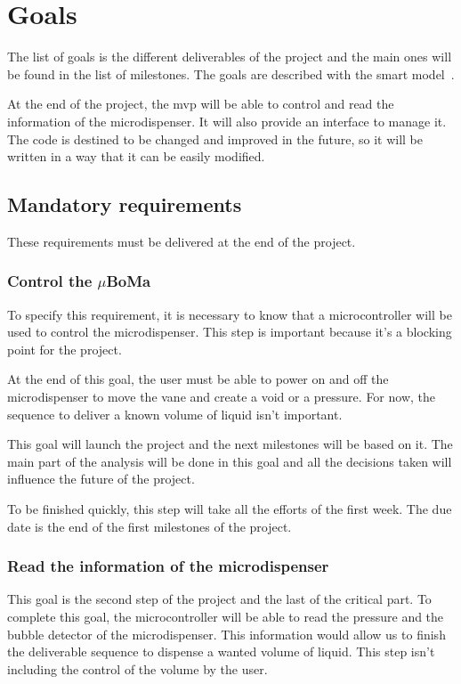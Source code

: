 \chapter{Goals}
\label{ch:goals}

The list of goals is the different deliverables of the project and the main ones will be found
in the list of milestones.
The goals are described with the \acrfull{smart} model~\cite{smart}.

At the end of the project, the \acrshort{mvp} will be able to control and read the information of the microdispenser.
It will also provide an interface to manage it.
The code is destined to be changed and improved in the future, so it will be written in a way that it can be easily modified.

\section{Mandatory requirements}
\label{sec:mandatory-requirements}

These requirements must be delivered at the end of the project.

\subsection{Control the $\mu$BoMa}
\label{subsec:control}
To specify this requirement, it is necessary to know that a microcontroller will be used to control the microdispenser.
This step is important because it's a blocking point for the project.

At the end of this goal, the user must be able to power on and off the microdispenser to move the vane and create a void or a pressure.
For now, the sequence to deliver a known volume of liquid isn't important.

This goal will launch the project and the next milestones will be based on it.
The main part of the analysis will be done in this goal and all the decisions taken will influence the future of the project.

To be finished quickly, this step will take all the efforts of the first week.
The due date is the end of the first milestones of the project.

\subsection{Read the information of the microdispenser}\label{subsec:read}
This goal is the second step of the project and the last of the critical part.
To complete this goal, the microcontroller will be able to read the pressure and the bubble detector of the microdispenser.
This information would allow us to finish the deliverable sequence to dispense a wanted volume of liquid.
This step isn't including the control of the volume by the user.

